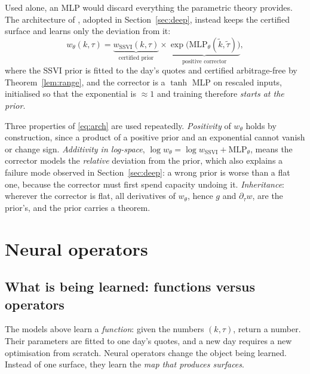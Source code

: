 Used alone, an MLP would discard everything the parametric theory provides. The architecture of
\cite{ackerer2020}, adopted in Section~\ref{sec:deep}, instead keeps the certified surface and
learns only the deviation from it:
\begin{equation}\label{eq:arch}
w_\theta(k,\tau)=\underbrace{w_{\mathrm{SSVI}}(k,\tau)}_{\text{certified prior}}\times
\underbrace{\exp\bigl(\mathrm{MLP}_\theta(\tilde k,\tilde\tau)\bigr)}_{\text{positive corrector}},
\end{equation}
where the SSVI prior is fitted to the day's quotes and certified arbitrage-free by
Theorem~\ref{lem:range}, and the corrector is a $\tanh$ MLP on rescaled inputs, initialised so
that the exponential is $\approx1$ and training therefore \emph{starts at the prior}.

Three properties of \eqref{eq:arch} are used repeatedly. \emph{Positivity} of $w_\theta$ holds by
construction, since a product of a positive prior and an exponential cannot vanish or change
sign. \emph{Additivity in log-space}, $\log w_\theta=\log w_{\mathrm{SSVI}}+\mathrm{MLP}_\theta$,
means the corrector models the \emph{relative} deviation from the prior, which also explains a
failure mode observed in Section~\ref{sec:deep}: a wrong prior is worse than a flat one, because
the corrector must first spend capacity undoing it. \emph{Inheritance}: wherever the corrector is
flat, all derivatives of $w_\theta$, hence $g$ and $\partial_\tau w$, are the prior's, and the
prior carries a theorem.

\section{Neural operators}\label{sec:opsec}

\subsection{What is being learned: functions versus operators}

The models above learn a \emph{function}: given the numbers $(k,\tau)$, return a number. Their
parameters are fitted to one day's quotes, and a new day requires a new optimisation from
scratch. Neural operators change the object being learned. Instead of one surface, they learn
the \emph{map that produces surfaces}.

